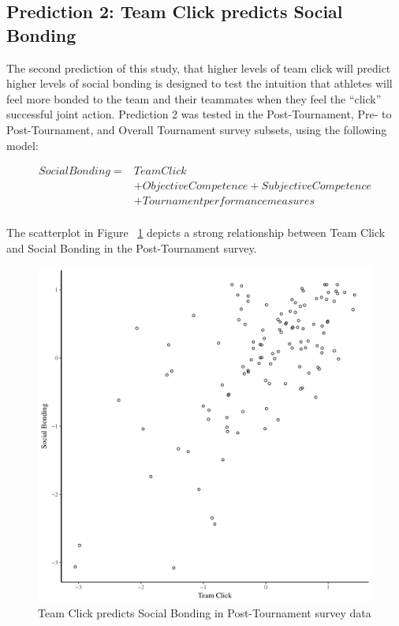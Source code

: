 \begin{CJK}{UTF8}{gbsn}
\subsection{Prediction 2: Team Click predicts Social Bonding}
The second prediction of this study, that higher levels of team click will predict higher levels of social bonding is designed to test the intuition that athletes will feel more bonded to the team and their teammates when they feel the ``click'' successful joint action.  Prediction 2 was tested in the Post-Tournament, Pre- to Post-Tournament, and Overall Tournament survey subsets, using the following model:


    \begin{align*}
      Social Bonding   =& Team Click\\
                      &+ Objective Competence + Subjective Competence  \\
                      &+ Tournament performance measures \\
    \end{align*}

  \bigskip

The scatterplot in Figure ~\ref{fig:clickBondBasicXY} depicts a strong relationship between Team Click and Social Bonding in the Post-Tournament survey.

\begin{figure}[htbp]
  \centering
\includegraphics[scale=.5]{images/clickBondBasicXY.pdf}
  \caption{Team Click predicts Social Bonding in Post-Tournament survey data}
  \label{fig:clickBondBasicXY}
\end{figure}


\end{CJK}
